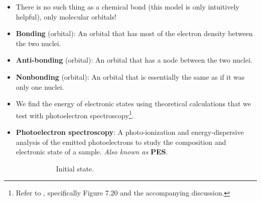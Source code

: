 \documentclass[../notes.tex]{subfiles}
\begin{document}
\begin{itemize}
    \item There is no such thing as a chemical bond (this model is only intuitively helpful), only molecular orbitals!
    \item \textbf{Bonding} (orbital): An orbital that has most of the electron density between the two nuclei.
    \item \textbf{Anti-bonding} (orbital): An orbital that has a node between the two nuclei.
    \item \textbf{Nonbonding} (orbital): An orbital that is essentially the same as if it was only one nuclei.
    \item We find the energy of electronic states using theoretical calculations that we test with photoelectron spectroscopy\footnote{Refer to \textcite{bib:APChemNotes}, specifically Figure 7.20 and the accompanying discussion.}.
    \item \textbf{Photoelectron spectroscopy}: A photo-ionization and energy-dispersive analysis of the emitted photoelectrons to study the composition and electronic state of a sample. \emph{Also known as} \textbf{PES}.
    \begin{figure}[h!]
        \centering
        \begin{subfigure}[b]{0.45\linewidth}
            \centering
            \caption{Initial state.}
            \label{fig:PES-atomica}
        \end{subfigure}
        \begin{subfigure}[b]{0.45\linewidth}
            \centering
\end{subfigure}
\end{figure}
\end{itemize}
\end{document}
